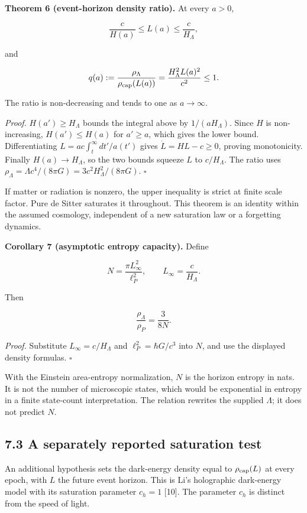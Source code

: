 \documentclass[
  11pt,
  a4paper,
]{article}
\begin{document}
\textbf{Theorem 6 (event-horizon density ratio).} At every \(a>0\),

\[
\frac c{H(a)}\leq L(a)\leq\frac c{H_\Lambda},
\]

and

\[
q(a):=\frac{\rho_\Lambda}{\rho_{\rm cap}(L(a))}
=\frac{H_\Lambda^2L(a)^2}{c^2}\leq1.
\]

The ratio is non-decreasing and tends to one as \(a\to\infty\).

\emph{Proof.} \(H(a')\geq H_\Lambda\) bounds the integral above by \(1/(aH_\Lambda)\). Since \(H\) is non-increasing, \(H(a')\leq H(a)\) for \(a'\geq a\), which gives the lower bound. Differentiating \(L=a c\int_t^\infty dt'/a(t')\) gives \(\dot L=HL-c\geq0\), proving monotonicity. Finally \(H(a)\to H_\Lambda\), so the two bounds squeeze \(L\) to \(c/H_\Lambda\). The ratio uses \(\rho_\Lambda=\Lambda c^4/(8\pi G)=3c^2H_\Lambda^2/(8\pi G)\). \(\square\)

If matter or radiation is nonzero, the upper inequality is strict at finite scale factor. Pure de Sitter saturates it throughout. This theorem is an identity within the assumed cosmology, independent of a new saturation law or a forgetting dynamics.

\textbf{Corollary 7 (asymptotic entropy capacity).} Define

\[
N=\frac{\pi L_\infty^2}{\ell_P^2},\qquad
L_\infty=\frac c{H_\Lambda}.
\]

Then

\[
\frac{\rho_\Lambda}{\rho_P}=\frac3{8N}.
\]

\emph{Proof.} Substitute \(L_\infty=c/H_\Lambda\) and \(\ell_P^2=\hbar G/c^3\) into \(N\), and use the displayed density formulas. \(\square\)

With the Einstein area-entropy normalization, \(N\) is the horizon entropy in nats. It is not the number of microscopic states, which would be exponential in entropy in a finite state-count interpretation. The relation rewrites the supplied \(\Lambda\); it does not predict \(N\).

\subsection{7.3 A separately reported saturation test}\label{a-separately-reported-saturation-test}

An additional hypothesis sets the dark-energy density equal to \(\rho_{\rm cap}(L)\) at every epoch, with \(L\) the future event horizon. This is Li's holographic dark-energy model with its saturation parameter \(c_h=1\) {[}10{]}. The parameter \(c_h\) is distinct from the speed of light.
\end{document}
